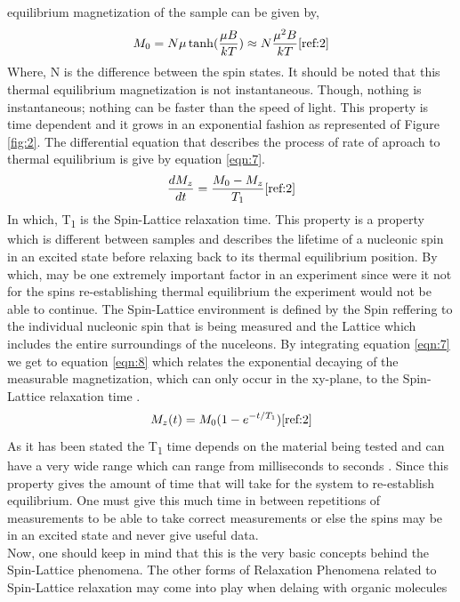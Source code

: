 \documentclass{article}
\begin{document}
{\begin{multicols}{2}
equilibrium magnetization of the sample can be given by,
\begin{equation}
M_0 = N\mu \tanh(\frac{\mu B}{kT})\approx N \frac{\mu^2 B}{kT}
\label{eqn:6}
\cite{ref:2}
\end{equation}
Where, N is the difference between the spin states. It should be noted that 
this thermal equilibrium magnetization is not instantaneous. Though, nothing is 
instantaneous; nothing can be faster than the speed of light. This property is 
time dependent and it grows in an exponential fashion as represented of Figure 
\ref{fig:2}. The differential equation that describes the process of rate of 
aproach to thermal equilibrium is give by equation \ref{eqn:7}.
\begin{equation}
\frac{dM_z}{dt} = \frac{M_0 - M_z}{T_1}
\label{eqn:7}
\cite{ref:2}
\end{equation}
In which, T\textsubscript{1} is the Spin-Lattice relaxation time. This property 
is a property which is different between samples and describes the lifetime of 
a nucleonic spin in an excited state before relaxing back to its thermal 
equilibrium position. By which, may be 
one extremely important factor in an experiment since were it not for the spins 
re-establishing thermal equilibrium the experiment would not be able to 
continue. The Spin-Lattice environment is defined by the Spin reffering to the 
individual nucleonic spin that is being measured and the Lattice which includes 
the entire surroundings of the nuceleons. By integrating equation \ref{eqn:7} 
we get to equation \ref{eqn:8} which relates the exponential decaying of the 
measurable magnetization, which can only occur in the xy-plane, to the 
Spin-Lattice relaxation time \cite{ref:1}.
\begin{equation}
M_z (t) = M_0 (1-e^{-t/T_1})
\label{eqn:8}
\cite{ref:2}
\end{equation}
As it has been stated the T\textsubscript{1} time depends on the material being 
tested and can have a very wide range which can range from milliseconds to 
seconds \cite{ref:2}. Since this property gives the amount of time that will 
take for the 
system to re-establish equilibrium. One must give this much time in between 
repetitions of measurements to be able to take correct measurements or else the 
spins may be in an excited state and never give useful data.
\\
Now, one should keep in mind that this is the very basic concepts behind the 
Spin-Lattice phenomena. The other forms of Relaxation Phenomena related to 
Spin-Lattice relaxation may come into play when delaing with organic molecules 

\end{multicols}}
\end{document}
